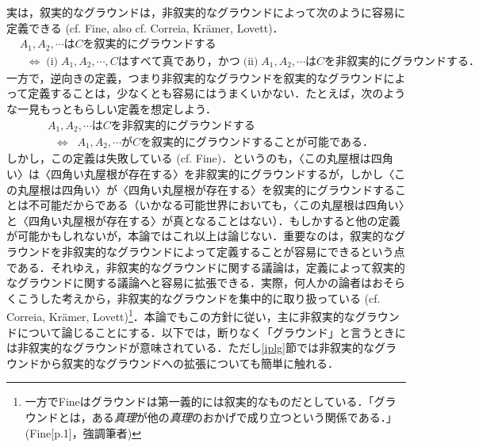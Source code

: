 \documentclass[twoside,14Q,dvipdfmx]{jsarticle}
\theoremstyle{definition}
\begin{document}
実は，叙実的なグラウンドは，非叙実的なグラウンドによって次のように容易に定義できる (cf. Fine\cite[p.49]{Fine2012a}, also cf. Correia\cite{Correia2014,Correia2017}, Kr\"{a}mer\cite{Kramer2018,Kramer2021}, Lovett\cite{Lovett2020})．
\begin{align*}
&A_1, A_2, \cdots はCを叙実的にグラウンドする\\
&\;\;\Leftrightarrow\;\text{(i)}\;A_1, A_2, \cdots, Cはすべて真であり，かつ\;\text{(ii)}\;A_1, A_2, \cdots はCを非叙実的にグラウンドする．
\end{align*}
一方で，逆向きの定義，つまり非叙実的なグラウンドを叙実的なグラウンドによって定義することは，少なくとも容易にはうまくいかない．たとえば，次のような一見もっともらしい定義を想定しよう．
\begin{align*}
&A_1, A_2, \cdots はCを非叙実的にグラウンドする\\
&\;\;\Leftrightarrow\;\;A_1, A_2, \cdots がCを叙実的にグラウンドすることが可能である．
\end{align*}
しかし，この定義は失敗している (cf. Fine\cite[p.49]{Fine2012a})．というのも，〈この丸屋根は四角い〉は〈四角い丸屋根が存在する〉を非叙実的にグラウンドするが，しかし〈この丸屋根は四角い〉が〈四角い丸屋根が存在する〉を叙実的にグラウンドすることは不可能だからである（いかなる可能世界においても，〈この丸屋根は四角い〉と〈四角い丸屋根が存在する〉が真となることはない）．もしかすると他の定義が可能かもしれないが，本論ではこれ以上は論じない．重要なのは，叙実的なグラウンドを非叙実的なグラウンドによって定義することが容易にできるという点である．それゆえ，非叙実的なグラウンドに関する議論は，定義によって叙実的なグラウンドに関する議論へと容易に拡張できる．実際，何人かの論者はおそらくこうした考えから，非叙実的なグラウンドを集中的に取り扱っている (cf. Correia\cite{Correia2017}, Kr\"{a}mer\cite{Kramer2018,Kramer2021}, Lovett\cite{Lovett2020})\footnote{一方でFine\cite{Fine2012a,Fine2012b}はグラウンドは第一義的には叙実的なものだとしている．「グラウンドとは，ある\emph{真理}が他の\emph{真理}のおかげで成り立つという関係である．」(Fine[p.1]\cite{Fine2012b}，強調筆者)}．本論でもこの方針に従い，主に非叙実的なグラウンドについて論じることにする．以下では，断りなく「グラウンド」と言うときには非叙実的なグラウンドが意味されている．ただし\ref{iplg}節では非叙実的なグラウンドから叙実的なグラウンドへの拡張についても簡単に触れる．
\end{document}
